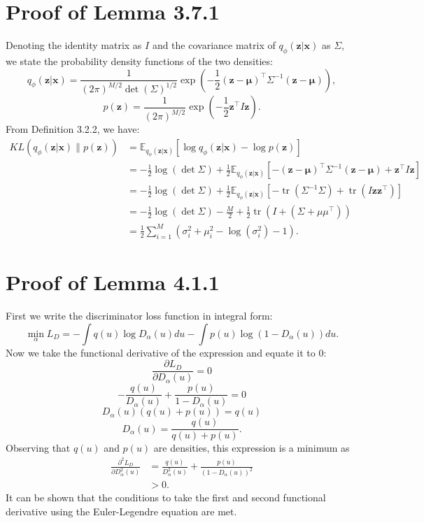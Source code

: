 \documentclass[honours,12pt]{unswthesis}
\newcommand{\E}{\mathbb{E}}
\DeclareMathOperator{\tr}{tr}
\numberwithin{equation}{section}
\theoremstyle{definition}
\begin{document}
\section{Proof of Lemma 3.7.1}\label{app:A.2}
Denoting the identity matrix as $I$ and the covariance matrix of $q_\phi(\bm{z}|\bm{x})$ as $\Sigma$, we state the probability density functions of the two densities:
\[q_\phi(\bm{z}|\bm{x})=\frac{1}{(2\pi)^{M/2}\det(\Sigma)^{1/2}}\exp\left(-\frac{1}{2}(\bm{z}-\bm{\mu})^\top\Sigma^{-1}(\bm{z}-\bm{\mu})\right),\]
\[p(\bm{z})=\frac{1}{(2\pi)^{M/2}}\exp\left(-\frac{1}{2}\bm{z}^\top I\bm{z}\right).\]
From Definition 3.2.2, we have:
\begin{align*}
KL(q_\phi(\bm{z}|\bm{x})\|p(\bm{z}))&=\E_{q_\phi(\bm{z}|\bm{x})}[\log q_\phi(\bm{z}|\bm{x})-\log p(\bm{z})]\\
&=-\frac{1}{2}\log(\det \Sigma)+\frac{1}{2}\E_{q_\phi(\bm{z}|\bm{x})}\left[-(\bm{z}-\bm{\mu})^\top \Sigma^{-1}(\bm{z}-\bm{\mu})+\bm{z}^\top I\bm{z}\right]\\
&=-\frac{1}{2}\log(\det \Sigma)+\frac{1}{2}\E_{q_\phi(\bm{z}|\bm{x})}\left[-\tr\left(\Sigma^{-1}\Sigma\right)+\tr\left(I\bm{z}\bm{z}^\top\right)\right]\\
&=-\frac{1}{2}\log(\det \Sigma)-\frac{M}{2}+\frac{1}{2}\tr\left(I+\left(\Sigma+\mu\mu^\top\right)\right)\\
&=\frac12 \sum_{i=1}^M\left(\sigma^2_i+\mu^2_i-\log(\sigma^2_i)-1\right).
\end{align*}
\section{Proof of Lemma 4.1.1}\label{app:A.3}
First we write the discriminator loss function in integral form:
\[\min_\alpha L_D=-\int q(u)\log D_\alpha(u)du-\int p(u)\log(1-D_\alpha(u))du.\]
Now we take the functional derivative of the expression and equate it to $0$:
\[\frac{\partial L_D}{\partial D_\alpha(u)}=0\]
\[-\frac{q(u)}{D_\alpha(u)}+\frac{p(u)}{1-D_\alpha(u)}=0\]
\[D_\alpha(u)(q(u)+p(u))=q(u)\]
\[D_\alpha(u)=\frac{q(u)}{q(u)+p(u)}.\]
Observing that $q(u)$ and $p(u)$ are densities, this expression is a minimum as
\begin{align*}
\frac{\partial^2L_D}{\partial D^2_\alpha(u)}&=\frac{q(u)}{D^2_\alpha(u)}+\frac{p(u)}{(1-D_\alpha(u))^2}\\
&>0.
\end{align*}
It can be shown that the conditions to take the first and second functional derivative using the Euler-Legendre equation are met.
\end{document}
